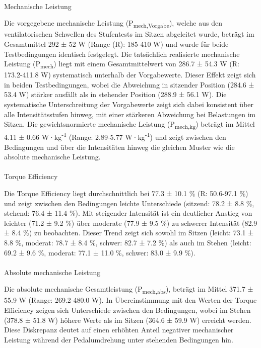 \documentclass[
  letterpaper,
  DIV=11]{scrartcl}
\makeatletter
\let\oldparagraph\paragraph
\renewcommand{\paragraph}{
    \@ifstar
      \xxxParagraphStar
      \xxxParagraphNoStar
  }
\newcommand{\xxxParagraphStar}[1]{\oldparagraph*{#1}\mbox{}}
\newcommand{\xxxParagraphNoStar}[1]{\oldparagraph{#1}\mbox{}}
\makeatother
\begin{document}
\paragraph{Mechanische Leistung}\label{mechanische-leistung}

Die vorgegebene mechanische Leistung (P\textsubscript{mech,Vorgabe}),
welche aus den ventilatorischen Schwellen des Stufentests im Sitzen
abgeleitet wurde, beträgt im Gesamtmittel 292 ± 52 W (Range (R): 185-410
W) und wurde für beide Testbedingungen identisch festgelegt. Die
tatsächlich realisierte mechanische Leistung (P\textsubscript{mech})
liegt mit einem Gesamtmittelwert von 286.7 ± 54.3 W (R: 173.2-411.8 W)
systematisch unterhalb der Vorgabewerte. Dieser Effekt zeigt sich in
beiden Testbedingungen, wobei die Abweichung in sitzender Position
(284.6 ± 53.4 W) stärker ausfällt als in stehender Position (288.9 ±
56.1 W). Die systematische Unterschreitung der Vorgabewerte zeigt sich
dabei konsistent über alle Intensitätsstufen hinweg, mit einer stärkeren
Abweichung bei Belastungen im Sitzen. Die gewichtsnormierte mechanische
Leistung (P\textsubscript{mech,kg}) beträgt im Mittel 4.11 ± 0.66
W·kg\textsuperscript{-1} (Range: 2.89-5.77 W·kg\textsuperscript{-1}) und
zeigt zwischen den Bedingungen und über die Intensitäten hinweg die
gleichen Muster wie die absolute mechanische Leistung.

\paragraph{Torque Efficiency}\label{torque-efficiency}

Die Torque Efficiency liegt durchschnittlich bei 77.3 ± 10.1 \% (R:
50.6-97.1 \%) und zeigt zwischen den Bedingungen leichte Unterschiede
(sitzend: 78.2 ± 8.8 \%, stehend: 76.4 ± 11.4 \%). Mit steigender
Intensität ist ein deutlicher Anstieg von leichter (71.2 ± 9.2 \%) über
moderate (77.9 ± 9.5 \%) zu schwerer Intensität (82.9 ± 8.4 \%) zu
beobachten. Dieser Trend zeigt sich sowohl im Sitzen (leicht: 73.1 ± 8.8
\%, moderat: 78.7 ± 8.4 \%, schwer: 82.7 ± 7.2 \%) als auch im Stehen
(leicht: 69.2 ± 9.6 \%, moderat: 77.1 ± 11.0 \%, schwer: 83.0 ± 9.9 \%).

\paragraph{Absolute mechanische
Leistung}\label{absolute-mechanische-leistung}

Die absolute mechanische Gesamtleistung (P\textsubscript{mech,abs}),
beträgt im Mittel 371.7 ± 55.9 W (Range: 269.2-480.0 W). In
Übereinstimmung mit den Werten der Torque Efficiency zeigen sich
Unterschiede zwischen den Bedingungen, wobei im Stehen (378.8 ± 51.8 W)
höhere Werte als im Sitzen (364.6 ± 59.9 W) erreicht werden. Diese
Diskrepanz deutet auf einen erhöhten Anteil negativer mechanischer
Leistung während der Pedalumdrehung unter stehenden Bedingungen hin.
\end{document}
